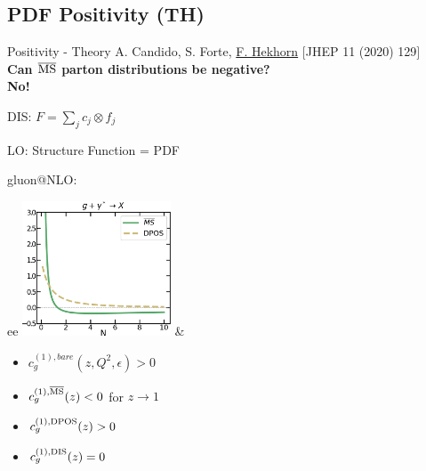 \author[Felix Hekhorn]{}

\newcommand{\mmsbar}{{\overline{\rm {MS}}}}
\newcommand{\msbar}{$\mmsbar$}
\providecommand{\iRef}[1]{{\tiny\color{UniSec6} $[$#1$]$}}

\subsection{PDF Positivity (TH)}

\begin{frame}{Positivity - Theory}
A. Candido, S. Forte, \underline{F. Hekhorn} \iRef{JHEP 11 (2020) 129}\\
{\bf Can \msbar{} parton distributions be negative?}\\
{\large \hfill \bf No!}

DIS: $F = \sum_j c_j \otimes f_j$

LO: Structure Function = PDF \checkmark

gluon@NLO:\\
\begin{tabular}{ee}
\includegraphics[height=4cm]{felix_positivity/disg.png}
&
\begin{itemize}
\item $c_g^{(1), bare}(z,Q^2,\epsilon) > 0$ \checkmark
\item $c_g^{(1), \mmsbar}(z) < 0$ for $z \to 1$
\item $c_g^{(1), \rm{DPOS}}(z) > 0$ \checkmark
\item $c_g^{(1), \rm{DIS}}(z) = 0$ \checkmark
\end{itemize}
\end{tabular}

\end{frame}

